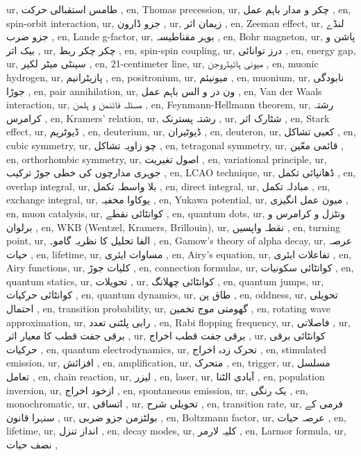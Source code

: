 ur,  طامس استقبالی حرکت ,
en, Thomas precession,
ur, چکر و مدار باہم عمل ,
en, spin-orbit interaction,
ur, جزو ڈارون ,
ur,  زیمان اثر ,
en, Zeeman effect,
ur,  لنڈے  جزو ضرب ,
en, Lande g-factor,
ur, بوہر مقناطیسہ ,
en, Bohr magneton,
ur, پاشن و بیک اثر ,
ur, چکر چکر ربط ,
en, spin-spin coupling,
ur, درز توانائی ,
en, energy gap,
ur,   سینٹی میٹر لکیر ,
en, 21-centimeter line,
ur, میونی ہائیڈروجن ,
en, muonic hydrogen,
ur, پازیٹرانیم ,
en, positronium,
ur,  میونیئم ,
en, muonium,
ur, نابودگی جوڑا ,
en, pair annihilation,
ur,  ون در و الس باہم عمل ,
en, Van der Waals interaction,
ur, مسئلہ فائنمن و ہلمن ,
en, Feynmann-Hellmann theorem,
ur, رشتہ کرامرس ,
en, Kramers' relation,
ur, رشتہ پسترنک ,
ur,  شٹارک اثر ,
en, Stark effect,
ur,  ڈیوٹریم ,
en, deuterium,
ur, ڈیوٹیران ,
en, deuteron,
ur, کعبی تشاکل ,
en, cubic symmetry,
ur, چو زاویہ تشاکل ,
en, tetragonal symmetry,
ur, قائمی معّین ,
en, orthorhombic symmetry,
ur,  اصول تغیریت ,
en, variational principle,
ur,  جوہری مدارچوں کی خطی جوڑ ترکیب ,
en, LCAO technique,
ur, ڈھانپائی تکمل ,
en, overlap integral,
ur,  بلا واسطہ تکمل ,
en, direct integral,
ur, مبادلہ تکمل ,
en, exchange integral,
ur,  یوکاوا مخفیہ ,
en, Yukawa potential,
ur,  میون عمل انگیزی ,
en, muon catalysis,
ur, کوانٹائی نقطے ,
en, quantum dots,
ur,  ونٹزل و کرامرس و برلوان ,
en, WKB (Wentzel, Kramers, Brillouin),
ur,  نقطہ واپسیں ,
en, turning point,
ur, الفا تحلیل کا نظریہ گامو۔ ,
en, Gamow's theory of alpha decay,
ur,  عرصہ حیات ,
en, lifetime,
ur,  مساوات ایئری ,
en, Airy's equation,
ur,  تفاعلات ایئری ,
en, Airy functions,
ur,  کلیات جوڑ ,
en, connection formulas,
ur, کوانٹائی سکونیات ,
en, quantum statics,
ur,  تحویلات ,
ur, کوانٹائی چھلانگ ,
en, quantum jumps,
ur, کوانٹائی حرکیات ,
en, quantum dynamics,
ur, طاق پن ,
en, oddness,
ur, تحویلی احتمال ,
en, transition probability,
ur,  گھومتی موج تخمین ,
en, rotating wave approximation,
ur,  رابی پلٹنی تعدد ,
en, Rabi flopping frequency,
ur, فاصلاتی ,
ur,  برقی جفت قطب کا معیار اثر ,
ur, برقی جفت قطب اخراج ,
ur,  کوانٹائی برقی حرکیات ,
en, quantum electrodynamics,
ur,  تحرک زدہ اخراج ,
en, stimulated emission,
ur, افزائش ,
en, amplification,
ur,  متحرک  ,
en, trigger,
ur,  مسلسل تعامل ,
en, chain reaction,
ur,  لیزر ,
en, laser,
ur,  آبادی الٹنا ,
en, population inversion,
ur,  ازخود اخراج ,
en, spontaneous emission,
ur, یک رنگی ,
en, monochromatic,
ur, اتساقی ,
ur, تحویلی شرح ,
en, transition rate,
ur,  فرمی کے سنہرا قانون ,
ur, بولٹزمن جزو ضربی ,
en, Boltzmann factor,
ur, عرصہ حیات ,
en, lifetime,
ur,  انداز تنزل ,
en, decay modes,
ur, کلیہ لارمر ,
en, Larmor formula,
ur, نصف حیات ,
